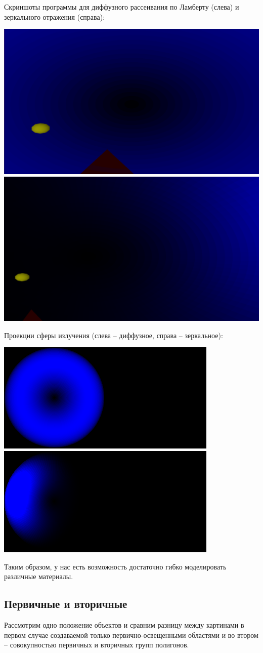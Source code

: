 Скриншоты программы для диффузного рассеивания по Ламберту (слева) и зеркального отражения (справа):

\includegraphics[width=0.499\linewidth]{lambert-screen.png}
\includegraphics[width=0.499\linewidth]{zerkalo-screen.png}

Проекции сферы излучения (слева -- диффузное, справа -- зеркальное):

\includegraphics[width=0.499\linewidth]{lambert-map.png}
\includegraphics[width=0.499\linewidth]{zerkalo-map.png}

Таким образом, у нас есть возможность достаточно гибко моделировать различные материалы. 

\subsection*{Первичные и вторичные}

Рассмотрим одно положение объектов и сравним разницу между картинами в первом случае создаваемой только первично-освещенными областями и во втором -- совокупностью первичных и вторичных групп полигонов. 

